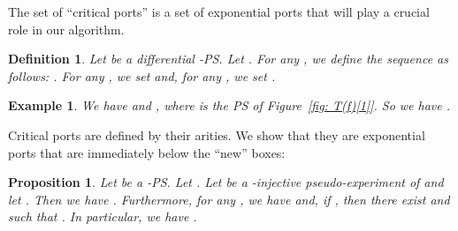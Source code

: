 \documentclass{article}
\theoremstyle{plain}
\newtheorem{definition}{Definition}
\newtheorem{example}{Example}
\newtheorem{prop}[theorem]{Proposition}
\begin{document}
The set  of ``critical ports'' is a set of exponential ports that will play a crucial role in our algorithm.



\begin{definition}\label{definition: critical}
Let  be a differential -PS. Let . For any , we define the sequence  as follows: . For any , we set   and, for any , we set   . 
\end{definition}

\begin{example}
We have  and , where  is the PS of Figure~\ref{fig: T(f)[1]}. So we have .
\end{example}



Critical ports are defined by their arities. We show that they are exponential ports that are immediately below the ``new'' boxes:

\begin{prop}\label{prop: critical ports below new boxes}
Let  be a -PS. 
Let . Let  be a -injective pseudo-experiment of  and let . Then we have . Furthermore, for any , we have  and, if , then there exist  and  such that . In particular, we have .
\end{prop}
\end{document}
